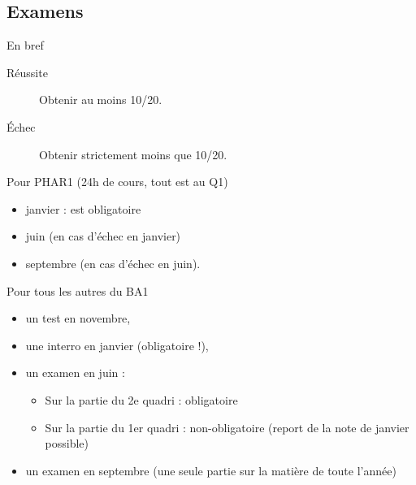 \documentclass[french,xcolor=svgnames]{beamer}
\begin{document}
\subsection{Examens}
\begin{frame}{En bref}
  \begin{description}
  \item[Réussite] Obtenir au moins 10/20.
  \item[Échec] Obtenir strictement moins que 10/20.
  \end{description}\pause

  Pour PHAR1 (24h de cours, tout est au Q1)
  \begin{itemize}[<+->]
  \item janvier : est obligatoire
  \item juin (en cas d'échec en janvier)
  \item septembre (en cas d'échec en juin).
  \end{itemize}

  Pour tous les autres du BA1
  \begin{itemize}[<+->]
  \item un test en novembre,
  \item une interro en janvier (obligatoire !),
  \item un examen en juin :
    \begin{itemize}[<+->]
    \item Sur la partie du 2e quadri : obligatoire
    \item Sur la partie du 1er quadri : non-obligatoire (report de la note de janvier possible)
    \end{itemize}
  \item un examen en septembre (une seule partie sur la matière de toute l'année)
  \end{itemize}
\end{frame}
\end{document}
